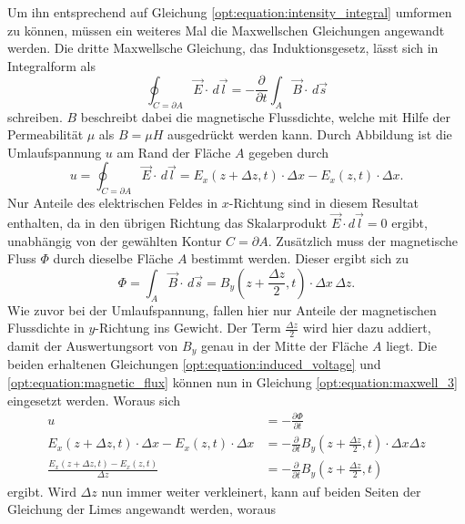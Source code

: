 Um ihn entsprechend auf Gleichung \eqref{opt:equation:intensity_integral} umformen zu können, müssen ein weiteres Mal die Maxwellschen Gleichungen angewandt werden.
Die dritte Maxwellsche Gleichung, das Induktionsgesetz, lässt sich in Integralform als
\begin{equation}
\oint_{C=\partial A} \vec{E} \cdot\, d\vec{l}
=
-\frac{\partial}{\partial t} \int_{A} \vec{B} \cdot\, d\vec{s}
\label{opt:equation:maxwell_3}
\end{equation}
schreiben.
$B$ beschreibt dabei die magnetische Flussdichte, welche mit Hilfe der Permeabilität $\mu$ als $B = \mu H$ ausgedrückt werden kann.
Durch Abbildung  ist die Umlaufspannung $u$ am Rand der Fläche $A$ gegeben durch
\begin{equation}
u
=
\oint_{C=\partial A} \vec{E} \cdot\, d\vec{l}
=
E_x(z+\Delta z,t) \cdot \Delta x - E_x(z,t) \cdot \Delta x
.
\label{opt:equation:induced_voltage}
\end{equation}
Nur Anteile des elektrischen Feldes in $x$-Richtung sind in diesem Resultat enthalten, da in den übrigen Richtung das Skalarprodukt $\vec{E} \cdot d\vec{l} = 0$ ergibt, unabhängig von der gewählten Kontur $C = \partial A$.
Zusätzlich muss der magnetische Fluss $\Phi$ durch dieselbe Fläche $A$ bestimmt werden.
Dieser ergibt sich zu
\begin{equation}
\Phi
=
\int_{A} \vec{B} \cdot\, d\vec{s}
=
B_y\left(z+\frac{\Delta z}{2},t\right) \cdot \Delta x \,\Delta z
.
\label{opt:equation:magnetic_flux}
\end{equation}
Wie zuvor bei der Umlaufspannung, fallen hier nur Anteile der magnetischen Flussdichte in $y$-Richtung ins Gewicht.
Der Term $\frac{\Delta z}{2}$ wird hier dazu addiert, damit der Auswertungsort von $B_y$ genau in der Mitte der Fläche $A$ liegt.
Die beiden erhaltenen Gleichungen \eqref{opt:equation:induced_voltage} und \eqref{opt:equation:magnetic_flux} können nun in Gleichung \eqref{opt:equation:maxwell_3} eingesetzt werden.
Woraus sich
\begin{align*}
u
&=
-\frac{\partial\Phi}{\partial t}
\\
E_x(z+\Delta z,t) \cdot \Delta x - E_x(z,t) \cdot \Delta x
&=
-\frac{\partial}{\partial t} B_y\left(z+\frac{\Delta z}{2},t\right) \cdot \Delta x \Delta z
\\
\frac{E_x(z+\Delta z,t) - E_x(z,t)}{\Delta z}
&=
-\frac{\partial}{\partial t} B_y\left(z+\frac{\Delta z}{2},t\right)
\end{align*}
ergibt.
Wird $\Delta z$ nun immer weiter verkleinert, kann auf beiden Seiten der Gleichung der Limes angewandt werden, woraus
